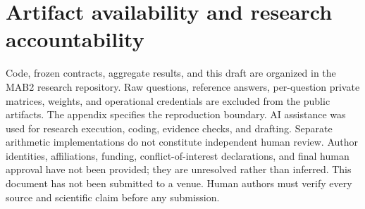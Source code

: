 \section*{Artifact availability and research accountability}
Code, frozen contracts, aggregate results, and this draft are organized
in the MAB2 research repository. Raw questions, reference answers,
per-question private matrices, weights, and operational credentials are
excluded from the public artifacts. The appendix specifies the reproduction
boundary. AI assistance was used for research execution, coding, evidence
checks, and drafting. Separate arithmetic implementations do not constitute
independent human review. Author identities, affiliations, funding,
conflict-of-interest declarations, and final human approval have not been
provided; they are unresolved rather than inferred. This document has not
been submitted to a venue. Human authors must verify every source and
scientific claim before any submission.
